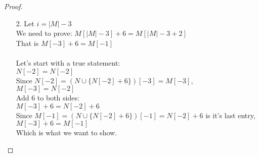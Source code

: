 \documentclass[fontsize=11pt]{article}
\begin{document}
\begin{enumerate}
\begin{enumerate}
\begin{proof}
\begin{enumerate}
    \item[2.] Let $i = |M| - 3$ \\
        We need to prove: $M[|M| - 3] + 6 = M[|M| - 3 + 2]$ \\
        That is $M[-3] + 6 = M[-1]$ \\
        \\
        Let's start with a true statement: \\
        $N[-2] = N[-2]$ \\
        Since $N[-2] = (N \cup \{ N[-2] + 6 \})[-3] = M[-3]$, \\
        $M[-3] = N[-2]$ \\
        Add 6 to both sides: \\ 
        $M[-3] + 6 = N[-2] + 6$ \\
        Since $M[-1] = (N \cup \{ N[-2] + 6 \})[-1] = N[-2] + 6$ is it's last entry, \\
        $M[-3] + 6 = M[-1]$ \\
        Which is what we want to show.
        
\end{enumerate}
\end{proof}


\end{enumerate}
\end{enumerate}
\end{document}
